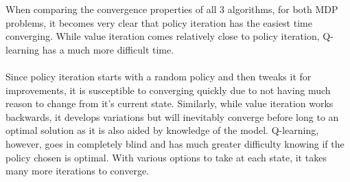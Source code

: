 \documentclass[h]{article}
\begin{document}
When comparing the convergence properties of all 3 algorithms, for both MDP problems, it becomes very 
clear that policy iteration has the easiest time converging.  While value 
iteration comes relatively close to policy iteration, Q-learning has a much more 
difficult time.  \\ \\ 
Since policy iteration starts with a random policy and then 
tweaks it for improvements, it is susceptible to converging quickly due to not 
having much reason to change from it's current state.  Similarly, while value 
iteration works backwards, it develops variations but will inevitably converge 
before long to an optimal solution as it is also aided by knowledge of the 
model.  Q-learning, however, goes in completely blind and has much greater 
difficulty knowing if the policy chosen is optimal.  With various options to 
take at each state, it takes many more iterations to converge.
\end{document}
